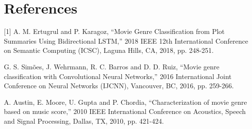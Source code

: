 \documentclass[sigconf]{acmart}
\begin{document}
\section{References}

[1] A. M. Ertugrul and P. Karagoz, ``Movie Genre Classification from Plot Summaries Using Bidirectional LSTM,'' 2018 IEEE 12th International Conference on Semantic Computing (ICSC), Laguna Hills, CA, 2018, pp. 248-251.

\noindent[2] G. S. Simões, J. Wehrmann, R. C. Barros and D. D. Ruiz, ``Movie genre classification with Convolutional Neural Networks,'' 2016 International Joint Conference on Neural Networks (IJCNN), Vancouver, BC, 2016, pp. 259-266.

\noindent[3] A. Austin, E. Moore, U. Gupta and P. Chordia, ``Characterization of movie genre based on music score,'' 2010 IEEE International Conference on Acoustics, Speech and Signal Processing, Dallas, TX, 2010, pp. 421-424.
\end{document}
